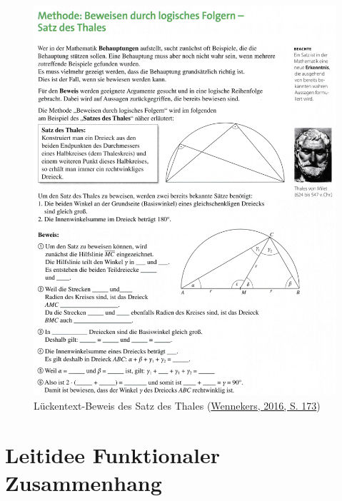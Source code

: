 \documentclass[
  ngerman,
]{scrbook}
\theoremstyle{definition}
\theoremstyle{definition}
\theoremstyle{definition}
\theoremstyle{definition}
\theoremstyle{remark}
\begin{document}
\begin{figure}

{\centering \includegraphics[width=0.75\linewidth]{pictures/C-ThalesBeweis} 

}

\caption{Lückentext-Beweis des Satz des Thales (\protect\hyperlink{ref-Wennekers2016}{Wennekers, 2016, S. 173})}\label{fig:ThalesBeweis}
\end{figure}

\hypertarget{leitidee-funktionaler-zusammenhang}{%
\chapter{Leitidee Funktionaler Zusammenhang}\label{leitidee-funktionaler-zusammenhang}}
\end{document}
